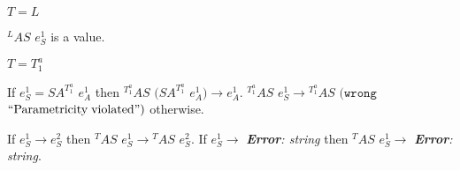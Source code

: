 \begin{case}
\begin{subcase}
\end{subcase}

\begin{subcase}

$T=L$

$^{L}AS$ $e_{S}^{1}$ is a value.

\end{subcase}

\begin{subcase}

$T=T_{1}^{a}$

If $e_{S}^{1}=SA^{T_{1}^{a}}$ $e_{A}^{1}$ then $^{T_{1}^{a}}AS$ $(SA^{T_{1}^{a}}$ $e_{A}^{1})\rightarrow e_{A}^{1}$.  $^{T_{1}^{a}}AS$ $e_{S}^{1}\rightarrow{^{T_{1}^{a}}A}S$ $(\mathtt{wrong}$ $\mathrm{``Parametricity\;violated"})$ otherwise.

\end{subcase}

If $e_{S}^{1}\rightarrow e_{S}^{2}$ then $^{T}AS$ $e_{S}^{1}\rightarrow{^{T}A}S$ $e_{S}^{2}$.  If $e_{S}^{1}\rightarrow$ \emph{\textbf{Error}: string} then $^{T}AS$ $e_{S}^{1}\rightarrow$ \emph{\textbf{Error}: string}.

\end{case}